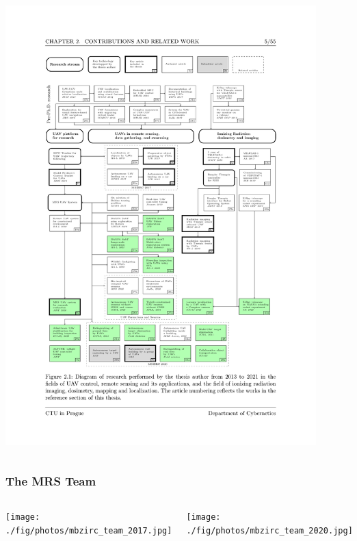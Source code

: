 \documentclass[aspectratio=169]{beamer}
\begin{document}
\begin{frame}
\begin{columns}[c]
\includegraphics[width=0.9\textwidth,trim={2.0cm 5.0cm 2.5cm 5.2cm},clip]{./fig/pubgraph.pdf}

\end{columns}

\end{frame}



\begin{frame}
\frametitle{The MRS Team}

  \begin{columns}[c]


  \texttt{[image: ./fig/photos/mbzirc\_team\_2017.jpg]}


  \texttt{[image: ./fig/photos/mbzirc\_team\_2020.jpg]}

  \end{columns}

\end{frame}
\end{document}
